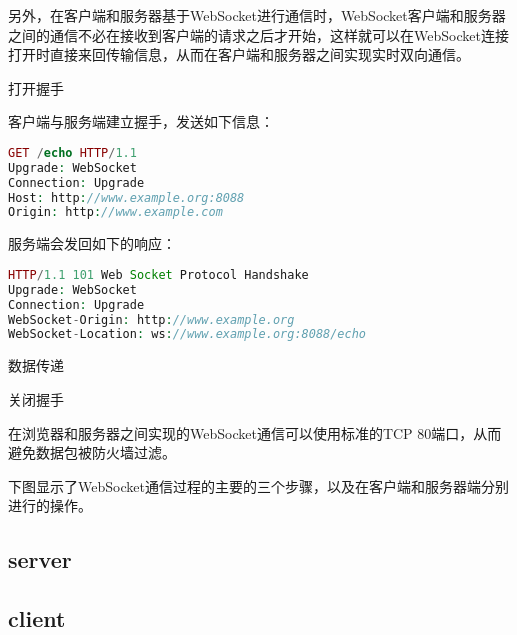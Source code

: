 另外，在客户端和服务器基于WebSocket进行通信时，WebSocket客户端和服务器之间的通信不必在接收到客户端的请求之后才开始，这样就可以在WebSocket连接打开时直接来回传输信息，从而在客户端和服务器之间实现实时双向通信。

\begin{compactenum}
\item 打开握手


客户端与服务端建立握手，发送如下信息：

\begin{lstlisting}[language=PHP]
GET /echo HTTP/1.1
Upgrade: WebSocket
Connection: Upgrade
Host: http://www.example.org:8088
Origin: http://www.example.com
\end{lstlisting}

服务端会发回如下的响应：

\begin{lstlisting}[language=PHP]
HTTP/1.1 101 Web Socket Protocol Handshake
Upgrade: WebSocket
Connection: Upgrade
WebSocket-Origin: http://www.example.org
WebSocket-Location: ws://www.example.org:8088/echo
\end{lstlisting}

\item 数据传递
\item 关闭握手
\end{compactenum}



在浏览器和服务器之间实现的WebSocket通信可以使用标准的TCP 80端口，从而避免数据包被防火墙过滤。


下图显示了WebSocket通信过程的主要的三个步骤，以及在客户端和服务器端分别进行的操作。






\subsection{server}





\subsection{client}

